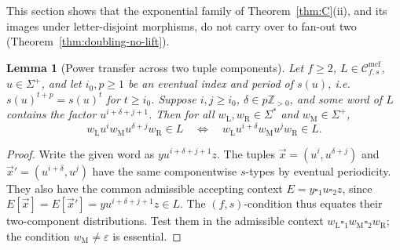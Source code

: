 \documentclass[11pt]{article}
\numberwithin{equation}{section}
\theoremstyle{plain}
\newtheorem{lemma}[theorem]{Lemma}
\theoremstyle{definition}
\theoremstyle{remark}
\newcommand{\Cmcf}[2]{\mathcal{C}^{\mathrm{mcf}}_{#1,#2}}
\newcommand{\tuple}[1]{\vec{#1}}
\newcommand{\blank}{\square}
\newcommand{\eps}{\varepsilon}
\theoremstyle{plain}
\begin{document}
This section shows that the exponential family of Theorem~\ref{thm:C}(ii),
and its images under letter-disjoint morphisms, do not carry over to fan-out
two (Theorem~\ref{thm:doubling-no-lift}).

\begin{lemma}[Power transfer across two tuple components]
\label{lem:power-transfer}
Let $f\ge2$, $L\in\Cmcf{f}{s}$, $u\in\Sigma^+$, and let
$i_0,p\ge1$ be an eventual index and period of $s(u)$, i.e.\
$s(u)^{t+p}=s(u)^t$ for $t\ge i_0$. Suppose
$i,j\ge i_0$, $\delta\in p\mathbb Z_{>0}$, and some word of $L$
contains the factor $u^{i+\delta+j+1}$. Then for all
$w_{\mathrm L},w_{\mathrm R}\in\Sigma^*$ and $w_{\mathrm M}\in\Sigma^+$,
\[
 w_{\mathrm L}u^iw_{\mathrm M}u^{\delta+j}w_{\mathrm R}\in L\quad\Longleftrightarrow\quad
 w_{\mathrm L}u^{i+\delta}w_{\mathrm M}u^jw_{\mathrm R}\in L.
\]
\end{lemma}
\begin{proof}
Write the given word as $yu^{i+\delta+j+1}z$.
The tuples $\tuple x=(u^i,u^{\delta+j})$ and
$\tuple x'=(u^{i+\delta},u^j)$ have the same componentwise $s$-types
by eventual periodicity. They also have the common admissible
accepting context $E=y\blank_1u\blank_2z$, since
$E[\tuple x]=E[\tuple x']=yu^{i+\delta+j+1}z\in L$.
The $(f,s)$-condition thus equates their two-component distributions.
Test them in the admissible context $w_{\mathrm L}\blank_1w_{\mathrm M}\blank_2w_{\mathrm R}$;
the condition $w_{\mathrm M}\ne\eps$ is essential.
\end{proof}
\end{document}
